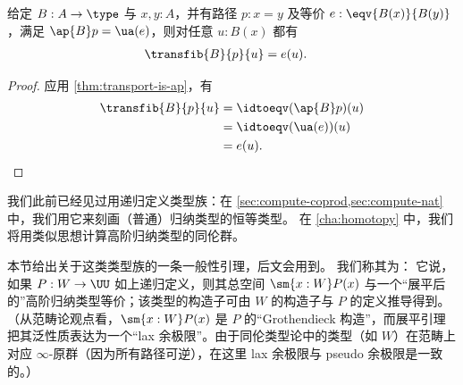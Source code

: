 \begin{lem}\label{thm:transport-is-given}
  给定 $B:A\to\type$ 与 $x,y:A$，并有路径 $p:x=y$ 及等价 $e:\eqv{B(x)}{B(y)}$，满足 $\ap{B}p = \ua(e)$，则对任意 $u:B(x)$ 都有
  \begin{align*}
    \transfib{B}{p}{u} &= e(u).
  \end{align*}
\end{lem}
\begin{proof}
  应用 \cref{thm:transport-is-ap}，有
  \begin{align*}
    \transfib{B}{p}{u} &= \idtoeqv(\ap{B}p)(u)\\
    &= \idtoeqv(\ua(e))(u)\\
    &= e(u).\qedhere
  \end{align*}
\end{proof}

我们此前已经见过用递归定义类型族：在 \cref{sec:compute-coprod,sec:compute-nat} 中，我们用它来刻画（普通）归纳类型的恒等类型。
在 \cref{cha:homotopy} 中，我们将用类似思想计算高阶归纳类型的同伦群。

本节给出关于这类类型族的一条一般性引理，后文会用到。
我们称其为：
%
%
它说，如果 $P:W\to\UU$ 如上递归定义，则其总空间 $\sm{x:W} P(x)$ 与一个“展平后的”高阶归纳类型等价；该类型的构造子可由 $W$ 的构造子与 $P$ 的定义推导得到。
（从范畴论观点看，$\sm{x:W} P(x)$ 是 $P$ 的“Grothendieck 构造”，而展平引理把其泛性质表达为一个“lax 余极限”。由于同伦类型论中的类型（如 $W$）在范畴上对应 $\infty$-原群（因为所有路径可逆），在这里 lax 余极限与 pseudo 余极限是一致的。）

